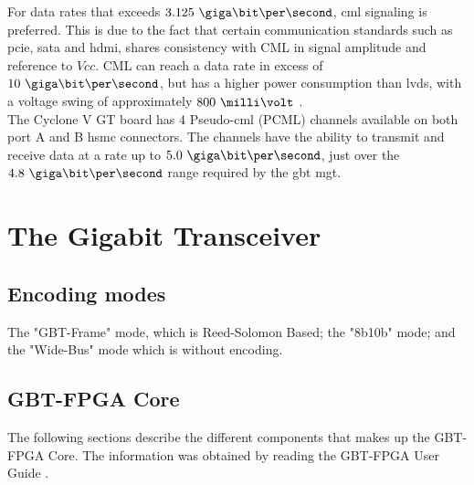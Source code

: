 \documentclass[main.tex]{subfiles}
\begin{document}
For data rates that exceeds $3.125\ \giga\bit\per\second$, \gls{cml} signaling is preferred. This is due to the fact that certain communication standards such as \acrshort{pcie}, \acrshort{sata} and \acrshort{hdmi}, shares consistency with CML in signal amplitude and reference to $Vcc$. CML can reach a data rate in excess of $10\ \giga\bit\per\second$, but has a higher power consumption than \gls{lvds}, with a voltage swing of approximately $800\ \milli\volt$ \cite{ti08lvds}.\\

The Cyclone V GT board has 4 Pseudo-\gls{cml} (PCML) channels available on both port A and B \gls{hsmc} connectors. The channels have the ability to transmit and receive data at a rate up to $5.0\ \giga\bit\per\second$, just over the $4.8\ \giga\bit\per\second$ range required by the \gls{gbt} \gls{mgt}. \cite{altera_cyclonekit}







\chapter{The Gigabit Transceiver} \label{chap:gbt}


\section{Encoding modes}

The "GBT-Frame" mode, which is Reed-Solomon Based; the "8b10b" mode; and the "Wide-Bus" mode which is without encoding.

\section{GBT-FPGA Core}
The following sections describe the different components that makes up the GBT-FPGA Core. The information was obtained by reading the GBT-FPGA User Guide \cite{gbt_fpga}.
\end{document}
